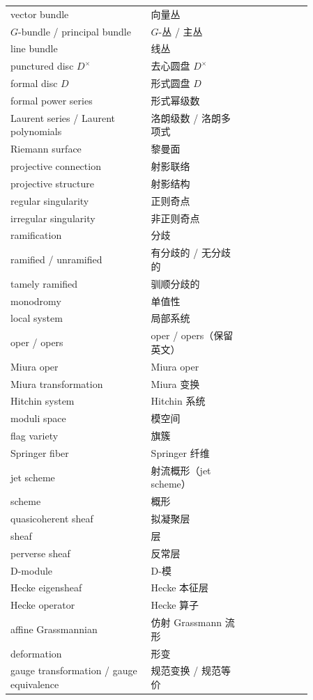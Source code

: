 \begin{longtable}{p{0.40\linewidth}p{0.28\linewidth}p{0.18\linewidth}}
vector bundle & 向量丛 &  \\
$G$-bundle / principal bundle & $G$-丛 / 主丛 &  \\
line bundle & 线丛 &  \\
punctured disc $D^\times$ & 去心圆盘 $D^\times$ &  \\
formal disc $D$ & 形式圆盘 $D$ &  \\
formal power series & 形式幂级数 &  \\
Laurent series / Laurent polynomials & 洛朗级数 / 洛朗多项式 &  \\
Riemann surface & 黎曼面 &  \\
projective connection & 射影联络 &  \\
projective structure & 射影结构 &  \\
regular singularity & 正则奇点 &  \\
irregular singularity & 非正则奇点 &  \\
ramification & 分歧 &  \\
ramified / unramified & 有分歧的 / 无分歧的 &  \\
tamely ramified & 驯顺分歧的 &  \\
monodromy & 单值性 &  \\
local system & 局部系统 &  \\
oper / opers & oper / opers（保留英文） &  \\
Miura oper & Miura oper &  \\
Miura transformation & Miura 变换 &  \\
Hitchin system & Hitchin 系统 &  \\
moduli space & 模空间 &  \\
flag variety & 旗簇 &  \\
Springer fiber & Springer 纤维 &  \\
jet scheme & 射流概形（jet scheme） &  \\
scheme & 概形 &  \\
quasicoherent sheaf & 拟凝聚层 &  \\
sheaf & 层 &  \\
perverse sheaf & 反常层 &  \\
D-module & D-模 &  \\
Hecke eigensheaf & Hecke 本征层 &  \\
Hecke operator & Hecke 算子 &  \\
affine Grassmannian & 仿射 Grassmann 流形 &  \\
deformation & 形变 &  \\
gauge transformation / gauge equivalence & 规范变换 / 规范等价 &  \\

\end{longtable}

